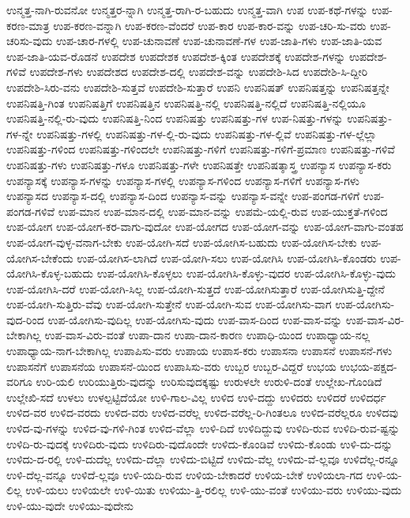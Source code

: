{ಉನ್ಮತ್ತ-ನಾಗಿ-ರುವನೋ
ಉನ್ಮತ್ತರ-ನ್ನಾಗಿ
ಉನ್ಮತ್ತ-ರಾಗಿ-ರ-ಬಹುದು
ಉನ್ಮತ್ತ-ವಾಗಿ
ಉಪ
ಉಪ-ಕಥೆ-ಗಳನ್ನು
ಉಪ-ಕರಣ-ಮಾತ್ರ
ಉಪ-ಕರಣ-ವನ್ನಾಗಿ
ಉಪ-ಕರಣ-ವೆಂದರೆ
ಉಪ-ಕಾರ
ಉಪ-ಕಾರ-ವನ್ನು
ಉಪ-ಚರಿ-ಸು-ವರು
ಉಪ-ಚರಿಸು-ವುದು
ಉಪ-ಚಾರ-ಗಳಲ್ಲಿ
ಉಪ-ಚುನಾವಣೆ
ಉಪ-ಚುನಾವಣೆ-ಗಳ
ಉಪ-ಜಾತಿ-ಗಳು
ಉಪ-ಜಾತಿ-ಯವ
ಉಪ-ಜಾತಿ-ಯವ-ರೊಡನೆ
ಉಪದೇಶ
ಉಪದೇಶಕ
ಉಪದೇಶ-ಕ್ಕಿಂತ
ಉಪದೇಶಕ್ಕೆ
ಉಪದೇಶ-ಗಳನ್ನು
ಉಪದೇಶ-ಗಳಿವೆ
ಉಪದೇಶ-ಗಳು
ಉಪದೇಶದ
ಉಪದೇಶ-ದಲ್ಲಿ
ಉಪದೇಶ-ವನ್ನು
ಉಪದೇಶಿ-ಸಿದ
ಉಪದೇಶಿ-ಸಿ-ದ್ದೀರಿ
ಉಪದೇಶಿ-ಸಿರು-ವನು
ಉಪದೇಶಿ-ಸುತ್ತವೆ
ಉಪದೇಶಿ-ಸುತ್ತಾರೆ
ಉಪನಿ
ಉಪನಿಷತ್
ಉಪನಿಷತ್ತನ್ನು
ಉಪನಿಷತ್ತನ್ನೇ
ಉಪನಿಷತ್ತಿ-ಗಿಂತ
ಉಪನಿಷತ್ತಿಗೆ
ಉಪನಿಷತ್ತಿನ
ಉಪನಿಷತ್ತಿ-ನಲ್ಲಿ
ಉಪನಿಷತ್ತಿ-ನಲ್ಲಿದೆ
ಉಪನಿಷತ್ತಿ-ನಲ್ಲಿಯೂ
ಉಪನಿಷತ್ತಿ-ನಲ್ಲಿ-ರು-ವುದು
ಉಪನಿಷತ್ತಿ-ನಿಂದ
ಉಪನಿಷತ್ತು
ಉಪನಿಷತ್ತು-ಗಳ
ಉಪ-ನಿಷತ್ತು-ಗಳನ್ನು
ಉಪನಿಷತ್ತು-ಗಳ-ನ್ನೇ
ಉಪನಿಷತ್ತು-ಗಳಲ್ಲಿ
ಉಪನಿಷತ್ತು-ಗಳ-ಲ್ಲಿ-ರು-ವುದು
ಉಪನಿಷತ್ತು-ಗಳ-ಲ್ಲಿವೆ
ಉಪನಿಷತ್ತು-ಗಳ-ಲ್ಲೆಲ್ಲಾ
ಉಪನಿಷತ್ತು-ಗಳಿಂದ
ಉಪನಿಷತ್ತು-ಗಳಿಂದಲೇ
ಉಪನಿಷತ್ತು-ಗಳಿಗೆ
ಉಪನಿಷತ್ತು-ಗಳಿಗೆ-ಪ್ರಮಾಣ
ಉಪನಿಷತ್ತು-ಗಳಿವೆ
ಉಪನಿಷತ್ತು-ಗಳು
ಉಪನಿಷತ್ತು-ಗಳೂ
ಉಪನಿಷತ್ತು-ಗಳೇ
ಉಪನಿಷತ್ತೇ
ಉಪನಿಷತ್ಶಾಸ್ತ್ರ
ಉಪನ್ಯಾಸ
ಉಪನ್ಯಾಸ-ಕರು
ಉಪನ್ಯಾಸಕ್ಕೆ
ಉಪನ್ಯಾಸ-ಗಳನ್ನು
ಉಪನ್ಯಾಸ-ಗಳಲ್ಲಿ
ಉಪನ್ಯಾಸ-ಗಳಿಂದ
ಉಪನ್ಯಾಸ-ಗಳಿಗೆ
ಉಪನ್ಯಾಸ-ಗಳು
ಉಪನ್ಯಾಸದ
ಉಪನ್ಯಾಸ-ದಲ್ಲಿ
ಉಪನ್ಯಾಸ-ದಿಂದ
ಉಪನ್ಯಾಸ-ವನ್ನು
ಉಪನ್ಯಾಸ-ವನ್ನೇ
ಉಪ-ಪಂಗಡ-ಗಳಿಗೆ
ಉಪ-ಪಂಗಡ-ಗಳಿವೆ
ಉಪ-ಮಾನ
ಉಪ-ಮಾನ-ದಲ್ಲಿ
ಉಪ-ಮಾನ-ವನ್ನು
ಉಪಮೆ-ಯಲ್ಲಿ-ರುವ
ಉಪ-ಯುಕ್ತತೆ-ಗಳಿಂದ
ಉಪ-ಯೋಗ
ಉಪ-ಯೋಗ-ಕರ-ವಾಗು-ವುದೋ
ಉಪ-ಯೋಗದ
ಉಪ-ಯೋಗ-ವನ್ನು
ಉಪ-ಯೋಗ-ವಾಗು-ವಂತಹ
ಉಪ-ಯೋಗ-ವುಳ್ಳ-ವನಾಗ-ಬೇಕು
ಉಪ-ಯೋಗಿ-ಸದೆ
ಉಪ-ಯೋಗಿಸ-ಬಹುದು
ಉಪ-ಯೋಗಿಸ-ಬೇಕು
ಉಪ-ಯೋಗಿಸ-ಬೇಕೆಂದು
ಉಪ-ಯೋಗಿಸ-ಲಾಗಿದೆ
ಉಪ-ಯೋಗಿ-ಸಲು
ಉಪ-ಯೋಗಿಸಿ
ಉಪ-ಯೋಗಿಸಿ-ಕೊಂಡರು
ಉಪ-ಯೋಗಿಸಿ-ಕೊಳ್ಳ-ಬಹುದು
ಉಪ-ಯೋಗಿಸಿ-ಕೊಳ್ಳಲು
ಉಪ-ಯೋಗಿಸಿ-ಕೊಳ್ಳು-ವುದರ
ಉಪ-ಯೋಗಿಸಿ-ಕೊಳ್ಳು-ವುದು
ಉಪ-ಯೋಗಿಸಿ-ದರೆ
ಉಪ-ಯೋಗಿ-ಸಿಲ್ಲ
ಉಪ-ಯೋಗಿ-ಸುತ್ತದೆ
ಉಪ-ಯೋಗಿಸುತ್ತಾರೆ
ಉಪ-ಯೋಗಿಸುತ್ತಿ-ದ್ದೇನೆ
ಉಪ-ಯೋಗಿ-ಸುತ್ತಿರು-ವೆವು
ಉಪ-ಯೋಗಿ-ಸುತ್ತೇನೆ
ಉಪ-ಯೋಗಿ-ಸುವ
ಉಪ-ಯೋಗಿಸು-ವಾಗ
ಉಪ-ಯೋಗಿಸು-ವುದ-ರಿಂದ
ಉಪ-ಯೋಗಿಸು-ವುದಿಲ್ಲ
ಉಪ-ಯೋಗಿಸು-ವುದು
ಉಪ-ವಾಸ-ದಿಂದ
ಉಪ-ವಾಸ-ವನ್ನು
ಉಪ-ವಾಸ-ವಿರ-ಬೇಕಾಗಿಲ್ಲ
ಉಪ-ವಾಸ-ವಿರು-ವಂತೆ
ಉಪಾ-ದಾನ
ಉಪಾ-ದಾನ-ಕಾರಣ
ಉಪಾಧಿ-ಯಿಂದ
ಉಪಾಧ್ಯಾಯ-ನಲ್ಲ
ಉಪಾಧ್ಯಾಯ-ನಾಗ-ಬೇಕಾಗಿಲ್ಲ
ಉಪಾಪಿಸು-ವರು
ಉಪಾಯ
ಉಪಾಸ-ಕರು
ಉಪಾಸನಾ
ಉಪಾಸನೆ
ಉಪಾಸನೆ-ಗಳು
ಉಪಾಸನೆಗೆ
ಉಪಾಸನೆಯ
ಉಪಾಸನೆ-ಯಿಂದ
ಉಪಾಸಿಸು-ವರು
ಉಬ್ಬರ
ಉಬ್ಬರ-ವಿದ್ದರೆ
ಉಭಯ
ಉಭಯ-ಪಕ್ಷದ-ವರಿಗೂ
ಉರಿ-ಯಲಿ
ಉರಿಯುತ್ತಿರು-ವುದನ್ನು
ಉರಿಸುವುದಕ್ಕಷ್ಟು
ಉರುಳಲೇ
ಉರುಳಿ-ದಂತೆ
ಉಲ್ಲೇಖ-ಗೊಂಡಿದೆ
ಉಲ್ಲೇಖಿ-ಸದೆ
ಉಳಲು
ಉಳಲ್ಪಟ್ಟಿದೆಯೋ
ಉಳಿ-ಗಾಲ-ವಿಲ್ಲ
ಉಳಿದ
ಉಳಿ-ದದ್ದು
ಉಳಿದರು
ಉಳಿದರೆ
ಉಳಿದರ್ಧ
ಉಳಿದ-ವರ
ಉಳಿದ-ವರದು
ಉಳಿದ-ವರು
ಉಳಿದ-ವರೆಲ್ಲ
ಉಳಿದ-ವರೆಲ್ಲ-ರಿ-ಗಿಂತಲೂ
ಉಳಿದ-ವರೆಲ್ಲರೂ
ಉಳಿದವು
ಉಳಿದ-ವು-ಗಳನ್ನು
ಉಳಿದ-ವು-ಗಳಿ-ಗಿಂತ
ಉಳಿದ-ವೆಲ್ಲಾ
ಉಳಿ-ದಿದೆ
ಉಳಿದಿದ್ದುವು
ಉಳಿದಿ-ರುವ
ಉಳಿದಿ-ರುವ-ಷ್ಟನ್ನು
ಉಳಿದಿ-ರು-ವುದಕ್ಕೆ
ಉಳಿದಿರು-ವುದು
ಉಳಿದಿರು-ವುದೊಂದೇ
ಉಳಿದು-ಕೊಂಡಿವೆ
ಉಳಿದು-ಕೊಂಡು
ಉಳಿ-ದು-ದನ್ನು
ಉಳಿದು-ದ-ರಲ್ಲಿ
ಉಳಿ-ದುದೆಲ್ಲ
ಉಳಿದು-ದೆಲ್ಲಾ
ಉಳಿದು-ಬಿಟ್ಟಿದೆ
ಉಳಿದು-ವೆಲ್ಲ
ಉಳಿದು-ವೆ-ಲ್ಲವೂ
ಉಳಿದೆಲ್ಲ-ರನ್ನೂ
ಉಳಿ-ದೆಲ್ಲ-ವನ್ನೂ
ಉಳಿದೆ-ಲ್ಲವೂ
ಉಳಿ-ಯದಿ-ರುವ
ಉಳಿಯ-ಬೇಕಾದರೆ
ಉಳಿಯ-ಬೇಕೆ
ಉಳಿಯಲಾ-ಗದ
ಉಳಿ-ಯ-ಲಿಲ್ಲ
ಉಳಿ-ಯಲು
ಉಳಿಯಲೇ
ಉಳಿ-ಯಿತು
ಉಳಿಯು-ತ್ತಿ-ರಲಿಲ್ಲ
ಉಳಿ-ಯು-ವಂತೆ
ಉಳಿಯು-ವರು
ಉಳಿಯು-ವುದು
ಉಳಿ-ಯು-ವುದೇ
ಉಳಿಯು-ವುದೇನು
}
